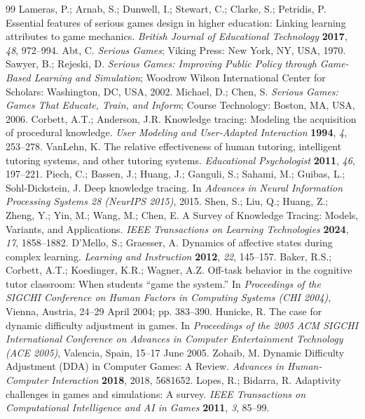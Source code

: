 \documentclass[11pt]{article}
\begin{document}
\begin{thebibliography}{99}
 Lameras, P.; Arnab, S.; Dunwell, I.; Stewart, C.; Clarke, S.; Petridis, P. Essential features of serious games design in higher education: Linking learning attributes to game mechanics. \textit{British Journal of Educational Technology} \textbf{2017}, \textit{48}, 972--994.
 Abt, C. \textit{Serious Games}; Viking Press: New York, NY, USA, 1970.
 Sawyer, B.; Rejeski, D. \textit{Serious Games: Improving Public Policy through Game-Based Learning and Simulation}; Woodrow Wilson International Center for Scholars: Washington, DC, USA, 2002.
 Michael, D.; Chen, S. \textit{Serious Games: Games That Educate, Train, and Inform}; Course Technology: Boston, MA, USA, 2006.
 Corbett, A.T.; Anderson, J.R. Knowledge tracing: Modeling the acquisition of procedural knowledge. \textit{User Modeling and User-Adapted Interaction} \textbf{1994}, \textit{4}, 253--278.
 VanLehn, K. The relative effectiveness of human tutoring, intelligent tutoring systems, and other tutoring systems. \textit{Educational Psychologist} \textbf{2011}, \textit{46}, 197--221.
 Piech, C.; Bassen, J.; Huang, J.; Ganguli, S.; Sahami, M.; Guibas, L.; Sohl-Dickstein, J. Deep knowledge tracing. In \textit{Advances in Neural Information Processing Systems 28 (NeurIPS 2015)}, 2015.
 Shen, S.; Liu, Q.; Huang, Z.; Zheng, Y.; Yin, M.; Wang, M.; Chen, E. A Survey of Knowledge Tracing: Models, Variants, and Applications. \textit{IEEE Transactions on Learning Technologies} \textbf{2024}, \textit{17}, 1858--1882.
 D'Mello, S.; Graesser, A. Dynamics of affective states during complex learning. \textit{Learning and Instruction} \textbf{2012}, \textit{22}, 145--157.
 Baker, R.S.; Corbett, A.T.; Koedinger, K.R.; Wagner, A.Z. Off-task behavior in the cognitive tutor classroom: When students ``game the system.'' In \textit{Proceedings of the SIGCHI Conference on Human Factors in Computing Systems (CHI 2004)}, Vienna, Austria, 24--29 April 2004; pp. 383--390.
 Hunicke, R. The case for dynamic difficulty adjustment in games. In \textit{Proceedings of the 2005 ACM SIGCHI International Conference on Advances in Computer Entertainment Technology (ACE 2005)}, Valencia, Spain, 15--17 June 2005.
 Zohaib, M. Dynamic Difficulty Adjustment (DDA) in Computer Games: A Review. \textit{Advances in Human-Computer Interaction} \textbf{2018}, 2018, 5681652.
 Lopes, R.; Bidarra, R. Adaptivity challenges in games and simulations: A survey. \textit{IEEE Transactions on Computational Intelligence and AI in Games} \textbf{2011}, \textit{3}, 85--99.

\end{thebibliography}
\end{document}
